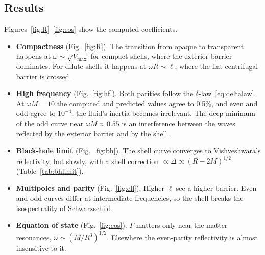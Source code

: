 \documentclass[11pt,a4paper]{article}
\numberwithin{equation}{section}
\begin{document}
\subsection{Results}
Figures~\ref{fig:R}--\ref{fig:eos} show the computed coefficients.
\begin{itemize}
\item \textbf{Compactness} (Fig.~\ref{fig:R}). The transition from opaque to transparent happens at $\omega\sim\sqrt{V_{\max}}$
for compact shells, where the exterior barrier dominates. For dilute shells it happens at $\omega R\sim\ell$, where the
flat centrifugal barrier is crossed.
\item \textbf{High frequency} (Fig.~\ref{fig:hf}). Both parities follow the $\delta$-law~\eqref{eq:deltalaw}. At
$\omega M=10$ the computed and predicted values agree to 0.5\%, and even and odd agree to $10^{-4}$: the fluid's inertia
becomes irrelevant. The deep minimum of the odd curve near $\omega M\approx0.55$ is an interference between the waves
reflected by the exterior barrier and by the shell.
\item \textbf{Black-hole limit} (Fig.~\ref{fig:bh}). The shell curve converges to Vishveshwara's reflectivity, but
slowly, with a shell correction $\propto\Delta\propto(R-2M)^{1/2}$ (Table~\ref{tab:bhlimit}).
\item \textbf{Multipoles and parity} (Fig.~\ref{fig:ell}). Higher $\ell$ see a higher barrier. Even and odd curves
differ at intermediate frequencies, so the shell breaks the isospectrality of Schwarzschild.
\item \textbf{Equation of state} (Fig.~\ref{fig:eos}). $\Gamma$ matters only near the matter resonances,
$\omega\sim(M/R^3)^{1/2}$. Elsewhere the even-parity reflectivity is almost insensitive to it.
\end{itemize}
\end{document}
